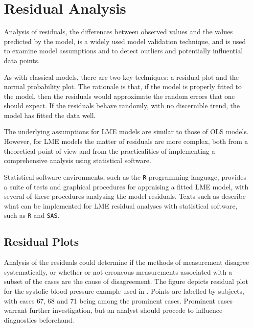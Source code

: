 \documentclass[12pt, a4paper]{report}
\theoremstyle{definition}
\theoremstyle{remark}
\begin{document}
\section{Residual Analysis}
Analysis of residuals, the differences between observed values and the values predicted by the model, is a widely used model validation technique, and is used to examine model assumptions and to detect outliers and potentially influential data points. 

As with classical models, there are two key techniques: a residual plot and the normal probability plot. The rationale is that, if the model is properly fitted to the model, then the residuals would approximate the random errors that one should expect. If the residuals behave randomly, with no discernible trend, the model has fitted the data well. 

The underlying assumptions for LME models are similar to those of OLS models. However, for LME models the matter of residuals are more complex, both from a theoretical point of view and from the practicalities of implementing a comprehensive analysis using statistical software.

Statistical software environments, such as the \texttt{R} programming language, provides a suite of tests and graphical procedures for appraising a fitted LME model, with several of these procedures analysing the model residuals. Texts such as \citet{PB,west,Galecki} describe what can be implemented for LME residual analyses with statistical software, such as \texttt{R} and \texttt{SAS}.





\subsection*{Residual Plots}
Analysis of the residuals could determine if the methods of measurement disagree systematically, or whether or not erroneous measurements associated with a subset of the cases are the cause of disagreement. 
The figure depicts residual plot for the systolic blood pressure example used in \citet{BA99}. Points are labelled by subjects, with cases 67, 68 and 71 being among the prominent cases. Prominent cases warrant further investigation, but an analyst should procede to influence diagnostics beforehand.
\end{document}
